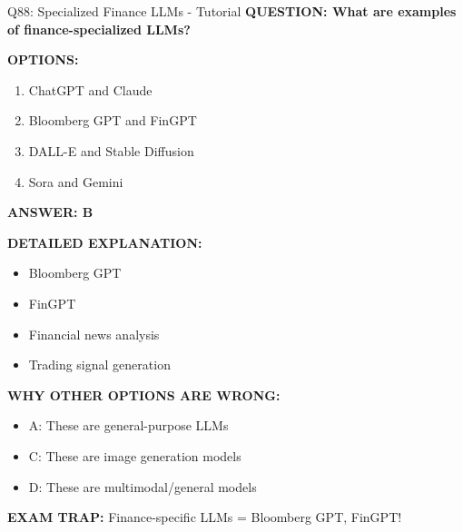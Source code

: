 \documentclass[8pt]{beamer}
\begin{document}
	\begin{frame}{Q88: Specialized Finance LLMs - Tutorial}
		\fontsize{6.5}{7.5}\selectfont
		\textbf{QUESTION: What are examples of finance-specialized LLMs?}
		
		\vspace{0.1cm}
		\textbf{OPTIONS:}
		\begin{enumerate}
			\item ChatGPT and Claude
			\item Bloomberg GPT and FinGPT
			\item DALL-E and Stable Diffusion
			\item Sora and Gemini
		\end{enumerate}
		
		\vspace{0.1cm}
		\textcolor{myblue}{\textbf{ANSWER: B}}
		
		\vspace{0.1cm}
		\textbf{DETAILED EXPLANATION:}
		\begin{itemize}
			\item Bloomberg GPT
			\item FinGPT
			\item Financial news analysis
			\item Trading signal generation
		\end{itemize}
		
		\vspace{0.1cm}
		\textcolor{myred}{\textbf{WHY OTHER OPTIONS ARE WRONG:}}
		\begin{itemize}
			\item \textcolor{myred}{A:} These are general-purpose LLMs
			\item \textcolor{myred}{C:} These are image generation models
			\item \textcolor{myred}{D:} These are multimodal/general models
		\end{itemize}
		
		\textcolor{myred}{\textbf{EXAM TRAP:}} Finance-specific LLMs = \textcolor{myblue}{Bloomberg GPT, FinGPT}!
	\end{frame}
	
\end{document}
